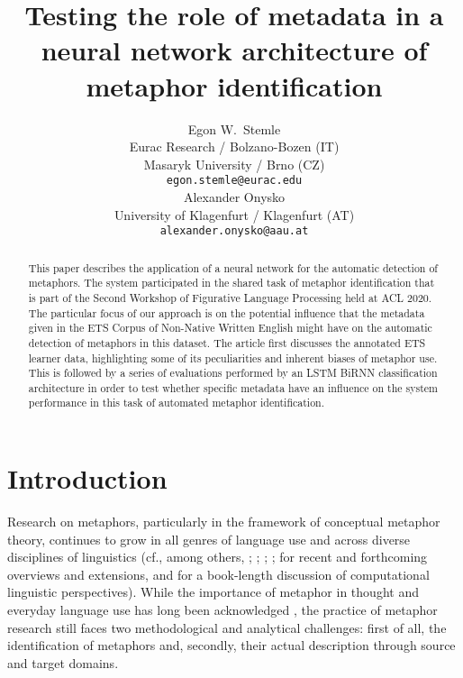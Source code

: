 \documentclass[11pt,a4paper]{article}
\title{Testing the role of metadata in a neural network architecture of metaphor identification}
\author{Egon W.~Stemle \\
  Eurac Research / Bolzano-Bozen (IT) \\
  Masaryk University / Brno (CZ) \\
  {\tt egon.stemle@eurac.edu} \\\And
  Alexander Onysko \\
  University of  Klagenfurt / Klagenfurt (AT) \\
  {\tt alexander.onysko@aau.at} \\}
\date{}
\begin{document}
\maketitle
\begin{abstract}
This paper describes the application of a neural network for the automatic detection of metaphors. The system participated in the shared task of metaphor identification that is part of the Second Workshop of Figurative Language Processing held at ACL 2020. The particular focus of our approach is on the potential influence that the metadata given in the ETS Corpus of Non-Native Written English might have on the automatic detection of metaphors in this dataset. The article first discusses the annotated ETS learner data, highlighting some of its peculiarities and inherent biases of metaphor use. This is followed by a series of evaluations performed by an LSTM BiRNN classification architecture in order to test whether specific metadata have an influence on the system performance in this task of automated metaphor identification. 
\end{abstract}



\section{Introduction}

Research on metaphors, particularly in the framework of conceptual metaphor theory, continues to grow in all genres of language use and across diverse disciplines of linguistics (cf., among others, \citet{littlemore:2019:MetaphorsMindSources}; \citet{gibbsjr:2017:MetaphorWarsConceptual}; \citet{charteris-black:2016:FireMetaphorsDiscourses}; \citet{kovecses:2020:ExtendedConceptualMetaphor}; \citet{callies-degani::MetaphorLanguageCulture} for recent and forthcoming overviews and extensions, and \citet{veale-EtAl:2016:MetaphorComputationalPerspective} for a book-length discussion of computational linguistic perspectives). While the importance of metaphor in thought and everyday language use has long been acknowledged \citep{LakoffJohnson80}, the practice of metaphor research still faces two methodological and analytical challenges: first of all, the identification of metaphors and, secondly, their actual description through source and target domains. 
\end{document}
